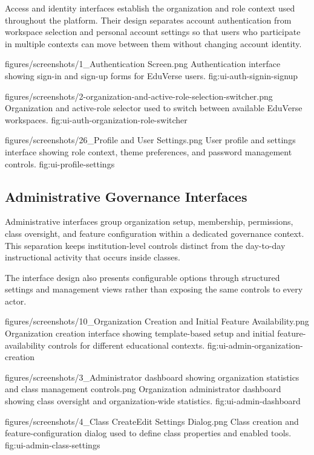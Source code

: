Access and identity interfaces establish the organization and role context used
throughout the platform. Their design separates account authentication from
workspace selection and personal account settings so that users who participate
in multiple contexts can move between them without changing account identity.

\EduUiFigure
  {figures/screenshots/1_Authentication Screen.png}
  {Authentication interface showing sign-in and sign-up forms for EduVerse users.}
  {fig:ui-auth-signin-signup}

\EduUiFigure
  {figures/screenshots/2-organization-and-active-role-selection-switcher.png}
  {Organization and active-role selector used to switch between available EduVerse workspaces.}
  {fig:ui-auth-organization-role-switcher}

\EduUiFigure
  {figures/screenshots/26_Profile and User Settings.png}
  {User profile and settings interface showing role context, theme preferences, and password management controls.}
  {fig:ui-profile-settings}

\clearpage

\subsection{Administrative Governance Interfaces}

Administrative interfaces group organization setup, membership,
permissions, class oversight, and feature configuration within a dedicated
governance context. This separation keeps institution-level controls distinct
from the day-to-day instructional activity that occurs inside classes.

The interface design also presents configurable options through structured
settings and management views rather than exposing the same controls to every
actor.

\EduUiFigure
  {figures/screenshots/10_Organization Creation and Initial Feature Availability.png}
  {Organization creation interface showing template-based setup and initial feature-availability controls for different educational contexts.}
  {fig:ui-admin-organization-creation}

\EduUiFigure
  {figures/screenshots/3_Administrator dashboard showing organization statistics and class management controls.png}
  {Organization administrator dashboard showing class oversight and organization-wide statistics.}
  {fig:ui-admin-dashboard}

\EduUiFigure
  {figures/screenshots/4_Class CreateEdit Settings Dialog.png}
  {Class creation and feature-configuration dialog used to define class properties and enabled tools.}
  {fig:ui-admin-class-settings}

